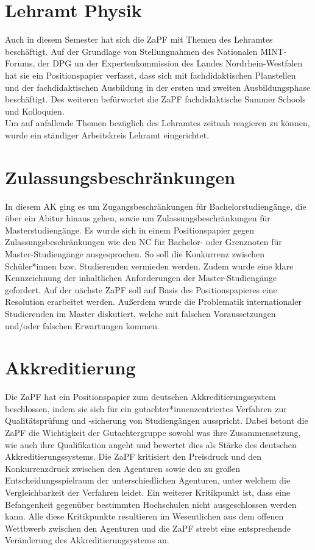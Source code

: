 \section*{Lehramt Physik}
Auch in diesem Semester hat sich die ZaPF mit Themen des Lehramtes beschäftigt. 
Auf der Grundlage von Stellungnahmen des Nationalen MINT-Forums, der DPG un der 
Expertenkommission des Landes Nordrhein-Westfalen hat sie ein Positionspapier verfasst, 
dass sich mit fachdidaktischen Planstellen und der fachdidaktischen Ausbildung in 
der ersten und zweiten Ausbildungsphase beschäftigt. Des weiteren befürwortet die ZaPF 
fachdidaktische Summer Schools und Kolloquien. \\
Um auf  anfallende Themen bezüglich des Lehramtes zeitnah reagieren zu können, wurde ein ständiger Arbeitskreis Lehramt eingerichtet. 


\section*{Zulassungsbeschränkungen}
In diesem AK ging es um Zugangsbeschränkungen für Bachelorstudiengänge, 
die über ein Abitur hinaus gehen, sowie um Zulassungsbeschränkungen für Masterstudiengänge.
Es wurde sich in einem Positionspapier gegen Zulassungsbeschränkungen wie den 
NC für Bachelor- oder Grenznoten für Master-Studiengänge ausgesprochen. 
So soll die Konkurrenz zwischen Schüler*innen bzw. Studierenden vermieden werden. 
Zudem wurde eine klare Kennzeichnung der inhaltlichen Anforderungen der Master-Studiengänge gefordert. 
Auf der nächste ZaPF soll auf Basis des Positionspapieres eine Resolution erarbeitet werden. 
Außerdem wurde die Problematik internationaler Studierenden im Master  diskutiert, 
welche mit falschen Voraussetzungen und/oder falschen Erwartungen kommen. \\


\section*{Akkreditierung}
Die ZaPF hat ein Positionspapier zum deutschen Akkreditierungssystem beschlossen, 
indem sie sich für ein gutachter*innenzentriertes Verfahren zur Qualitätsprüfung und -sicherung 
von Studiengängen ausspricht. Dabei betont die ZaPF die Wichtigkeit der Gutachtergruppe sowohl 
was ihre Zusammensetzung, wie auch ihre Qualifikation angeht und bewertet dies als Stärke 
des deutschen Akkreditierungssystems. Die ZaPF kritisiert den Preisdruck und den Konkurrenzdruck 
zwischen den Agenturen sowie den zu großen Entscheidungsspielraum der unterschiedlichen Agenturen, 
unter welchem die Vergleichbarkeit der Verfahren leidet. Ein weiterer Kritikpunkt 
ist, dass eine Befangenheit gegenüber bestimmten Hochschulen nicht ausgeschlossen werden kann. 
Alle diese Kritikpunkte resultieren im Wesentlichen aus dem offenen Wettbwerb zwischen 
den Agenturen und die ZaPF strebt eine entsprechende Veränderung des Akkreditierungsystems an.

